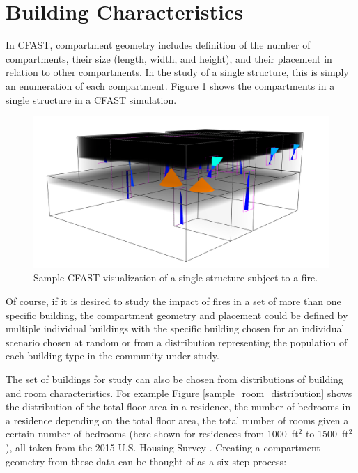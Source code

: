 \documentclass[12pt,twoside]{book}
\begin{document}
\section{Building Characteristics}

In CFAST, compartment geometry includes definition of the number of compartments, their size (length, width, and height), and their placement in relation to other compartments. In the study of a single structure, this is simply an enumeration of each compartment. Figure \ref{sample_visualization} shows the compartments in a single structure in a CFAST simulation.

\begin{figure}[h!]
\centering
\includegraphics[width=4.5in]{FIGURES/Sample_Visualization.png}
\caption{Sample CFAST visualization of a single structure subject to a fire.}
\label{sample_visualization}
\end{figure}

Of course, if it is desired to study the impact of fires in a set of more than one specific building, the compartment geometry and placement could be defined by multiple individual buildings with the specific building chosen for an individual scenario chosen at random or from a distribution representing the population of each building type in the community under study.

The set of buildings for study can also be chosen from distributions of building and room characteristics. For example Figure \ref{sample_room_distribution} shows the distribution of the total floor area in a residence, the number of bedrooms in a residence depending on the total floor area, the total number of rooms given a certain number of bedrooms (here shown for residences from 1000~ft$^2$ to 1500~ft$^2$), all taken from the 2015 U.S. Housing Survey \cite{AHS2015}. Creating a compartment geometry from these data can be thought of as a six step process:
\end{document}
